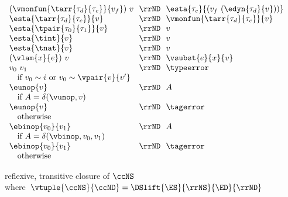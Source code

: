 \begin{flushleft}
\begin{minipage}[t]{\columnwidth}
\begin{mathpar}
\end{mathpar}

\smallskip
{}\\
$\begin{array}{l@{~~}c@{~~}l l}
  (\vmonfun{\tarr{\tau_d}{\tau_c}}{v_f})~v & \rrND & \esta{\tau_c}{(v_f~(\edyn{\tau_d}{v}))} &
\\
  \esta{\tarr{\tau_d}{\tau_c}}{v} & \rrND & \vmonfun{\tarr{\tau_d}{\tau_c}}{v} &
\\
  \esta{\tpair{\tau_0}{\tau_1}}{v} & \rrND & v &
\\
  \esta{\tint}{v} & \rrND & v &
\\
  \esta{\tnat}{v} & \rrND & v &
\\
  (\vlam{x}{e})~v & \rrND & \vsubst{e}{x}{v} &
\\
  v_0~v_1 & \rrND & \typeerror &
\\\multicolumn{3}{l}{\mbox{\quad if $v_0 \sim i$ or $v_0 \sim \vpair{v}{v'}$}}
\\
  \eunop{v} & \rrND & A &
\\\multicolumn{3}{l}{\mbox{\quad if $A = \delta(\vunop, v)$}}
\\
  \eunop{v} & \rrND & \tagerror &
\\\multicolumn{3}{l}{\mbox{\quad otherwise}}
\\
  \ebinop{v_0}{v_1} & \rrND & A &
\\\multicolumn{3}{l}{\mbox{\quad if $A = \delta(\vbinop, v_0, v_1)$}}
\\
  \ebinop{v_0}{v_1} & \rrND & \tagerror &
\\\multicolumn{3}{l}{\mbox{\quad otherwise}}
\end{array}$


\smallskip
{} reflexive, transitive closure of $\ccNS$\\
\mbox{\quad where $\vtuple{\ccNS}{\ccND} = \DSlift{\ES}{\rrNS}{\ED}{\rrND}$}
\smallskip
\end{minipage}\hspace{\columnsep}%
\begin{minipage}[t]{\columnwidth}
\\
\begin{mathpar}


\end{mathpar}
\end{minipage}
\end{flushleft}

